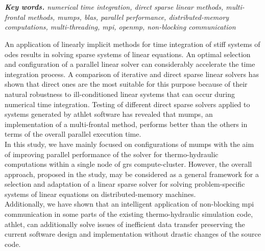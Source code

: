 \chapter{\abstractname}

\textit{\textbf{Key words.} numerical time integration, direct sparse linear methods, multi-frontal methods, \acrshort{mumps}, \acrshort{blas}, parallel performance, distributed-memory computations,  multi-threading, \acrshort{mpi}, \acrshort{openmp}, non-blocking communication}

\vspace{10mm}



An application of linearly implicit methods for time integration of stiff systems of \acrshort{ode}s  results in solving sparse systems of linear equations. An optimal selection and configuration of a parallel linear solver can considerably accelerate the time integration process. A comparison of iterative and direct sparse linear solvers has shown that direct ones are the most suitable for this purpose because of their natural robustness to ill-conditioned linear systems that can occur during numerical time integration. Testing of different direct sparse solvers applied to systems generated by \acrshort{athlet} software has revealed that \acrshort{mumps}, an implementation of a multi-frontal method, performs better than the others in terms of the overall parallel execution time.\\



In this study, we have mainly focused on configurations of \acrshort{mumps} with the aim of improving parallel performance of the solver for thermo-hydraulic computations within a single node of \acrshort{grs} compute-cluster. However, the overall approach,  proposed in the study, may be considered as a general framework for a selection and adaptation of a linear sparse solver for solving problem-specific systems of linear equations on distributed-memory machines.\\


Additionally, we have shown that an intelligent application of non-blocking \acrshort{mpi} communication in some parts of the existing thermo-hydraulic simulation code, \acrshort{athlet}, can additionally solve issues of inefficient data transfer preserving the current software design and implementation without drastic changes of the source code.\\